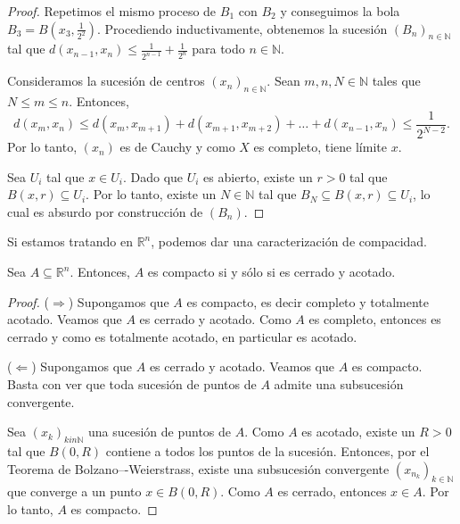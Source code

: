 \begin{proof}
	Repetimos el mismo proceso de $B_1$ con $B_2$ y conseguimos la bola $B_3 = B(x_3, \frac{1}{2^2})$. Procediendo inductivamente, obtenemos la sucesión $(B_n)_{n \in \mathbb{N}}$ tal que $d(x_{n-1}, x_{n}) \leq \frac{1}{2^{n-1}} + \frac{1}{2^n}$ para todo $n \in \mathbb{N}$.

	\begin{center}
		
	\end{center}

	Consideramos la sucesión de centros $(x_n)_{n \in \mathbb{N}}$. Sean $m, n, N \in \mathbb{N}$ tales que $N \leq m \leq n$. Entonces,
	\begin{equation*}
		d(x_m, x_n) \leq d(x_m, x_{m+1}) + d(x_{m+1}, x_{m+2}) + \dots + d(x_{n-1}, x_n) \leq \frac{1}{2^{N-2}}.
	\end{equation*}
	Por lo tanto, $(x_n)$ es de Cauchy y como $X$ es completo, tiene límite $x$.

	Sea $U_i$ tal que $x \in U_i$. Dado que $U_i$ es abierto, existe un $r > 0$ tal que $B(x, r) \subseteq U_i$. Por lo tanto, existe un $N \in \mathbb{N}$ tal que $B_{N} \subseteq B(x, r) \subseteq U_i$, lo cual es absurdo por construcción de $(B_n)$.
\end{proof}

Si estamos tratando en $\mathbb{R}^n$, podemos dar una caracterización de compacidad.

\begin{theorem}
	Sea $A \subseteq \mathbb{R}^n$. Entonces, $A$ es compacto si y sólo si es cerrado y acotado.
\end{theorem}

\begin{proof}
	($\Rightarrow$) Supongamos que $A$ es compacto, es decir completo y totalmente acotado. Veamos que $A$ es cerrado y acotado. Como $A$ es completo, entonces es cerrado y como es totalmente acotado, en particular es acotado.

	($\Leftarrow$) Supongamos que $A$ es cerrado y acotado. Veamos que $A$ es compacto. Basta con ver que toda sucesión de puntos de $A$ admite una subsucesión convergente.

	Sea $(x_k)_{k in \mathbb{N}}$ una sucesión de puntos de $A$. Como $A$ es acotado, existe un $R > 0$ tal que $B(0, R)$ contiene a todos los puntos de la sucesión. Entonces, por el Teorema de Bolzano–-Weierstrass, existe una subsucesión convergente $(x_{n_k})_{k \in \mathbb{N}}$ que converge a un punto $x \in B(0, R)$. Como $A$ es cerrado, entonces $x \in A$. Por lo tanto, $A$ es compacto.
\end{proof}


